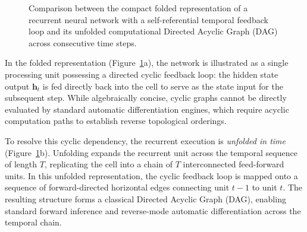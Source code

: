 \documentclass[../../../main.tex]{subfiles}
\begin{document}
\begin{figure}[htbp]
\caption{Comparison between the compact folded representation of a recurrent neural network with a self-referential temporal feedback loop and its unfolded computational Directed Acyclic Graph (DAG) across consecutive time steps.}
\label{fig:rnn_folded_unrolled}
\end{figure}

In the folded representation (Figure~\ref{fig:rnn_folded_unrolled}a), the network is illustrated as a single processing unit possessing a directed cyclic feedback loop: the hidden state output $\mathbf{h}_t$ is fed directly back into the cell to serve as the state input for the subsequent step. While algebraically concise, cyclic graphs cannot be directly evaluated by standard automatic differentiation engines, which require acyclic computation paths to establish reverse topological orderings.

To resolve this cyclic dependency, the recurrent execution is \textit{unfolded in time} (Figure~\ref{fig:rnn_folded_unrolled}b). Unfolding expands the recurrent unit across the temporal sequence of length $T$, replicating the cell into a chain of $T$ interconnected feed-forward units. In this unfolded representation, the cyclic feedback loop is mapped onto a sequence of forward-directed horizontal edges connecting unit $t-1$ to unit $t$. The resulting structure forms a classical Directed Acyclic Graph (DAG), enabling standard forward inference and reverse-mode automatic differentiation across the temporal chain.
\end{document}
